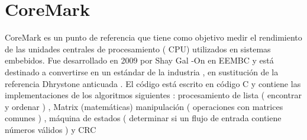 	\section{CoreMark}

	CoreMark es un punto de referencia que tiene como objetivo medir el rendimiento de las unidades centrales de procesamiento ( CPU) utilizados en
	sistemas embebidos. Fue desarrollado en 2009 por Shay Gal -On en EEMBC y está destinado a convertirse en un estándar de la industria , en sustitución
	de la referencia Dhrystone anticuada . El código está escrito en código C y contiene las implementaciones de los algoritmos siguientes :
	procesamiento de lista ( encontrar y ordenar ) , Matrix (matemáticas) manipulación ( operaciones con matrices comunes ) , máquina de estados (
	determinar si un flujo de entrada contiene números válidos ) y CRC
